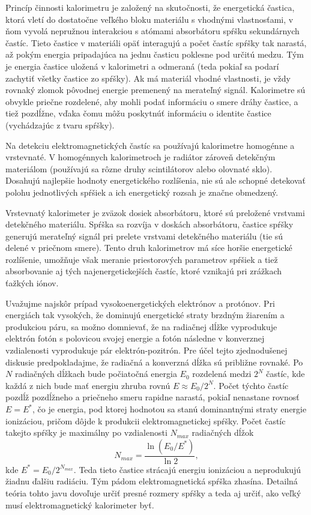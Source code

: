 \documentclass[../../main.tex]{subfiles}
\begin{document}
Princíp činnosti kalorimetru je založený na skutočnosti, že energetická častica, ktorá vletí do dostatočne veľkého bloku materiálu s vhodnými vlastnosťami, v ňom vyvolá nepružnou interakciou s atómami absorbátoru spŕšku sekundárnych častíc. Tieto častice v materiáli opäť interagujú a počet častíc spŕšky tak narastá, až pokým energia pripadajúca na jednu časticu poklesne pod určitú medzu. Tým je energia častice uložená v kalorimetri a odmeraná (teda pokiaľ sa podarí zachytiť všetky častice zo spŕšky). Ak má materiál vhodné vlastnosti, je vždy rovnaký zlomok pôvodnej energie premenený na merateľný signál. Kalorimetre sú obvykle priečne rozdelené, aby mohli podať informáciu o smere dráhy častice, a tiež pozdĺžne, vďaka čomu môžu poskytnúť informáciu o identite častice (vychádzajúc z tvaru spŕšky).

Na detekciu elektromagnetických častíc sa používajú kalorimetre homogénne a vrstevnaté. V homogénnych kalorimetroch je radiátor zároveň detekčným materiálom (používajú sa rôzne druhy scintilátorov alebo olovnaté sklo). Dosahujú najlepšie hodnoty energetického rozlíšenia, nie sú ale schopné detekovať polohu jednotlivých spŕšiek a ich energetický rozsah je značne obmedzený.

Vrstevnatý kalorimeter je zväzok dosiek absorbátoru, ktoré sú preložené vrstvami detekčného materiálu. Spŕška sa rozvíja v doskách absorbátoru, častice spŕšky generujú merateľný signál pri prelete vrstvami detekčného materiálu (tie sú delené v priečnom smere). Tento druh kalorimetrov má síce horšie energetické rozlíšenie, umožňuje však meranie priestorových parametrov spŕšiek a tiež absorbovanie aj tých najenergetickejších častíc, ktoré vznikajú pri zrážkach ťažkých iónov.

Uvažujme najskôr prípad vysokoenergetických elektrónov a protónov. Pri energiách tak vysokých, že dominujú energetické straty brzdným žiarením a produkciou páru, sa možno domnievať, že na radiačnej dĺžke vyprodukuje elektrón fotón s polovicou svojej energie a fotón následne v konverznej vzdialenosti vyprodukuje pár elektrón-pozitrón. Pre účel tejto zjednodušenej diskusie predpokladajme, že radiačná a konverzná dĺžka sú približne rovnaké. Po $N$ radiačných dĺžkach bude počiatočná energia $E_0$ rozdelená medzi $2^N$ častíc, kde každá z nich bude mať energiu zhruba rovnú $E\approx E_0/2^N$. Počet týchto častíc pozdĺž pozdĺžneho a priečneho smeru rapidne narastá, pokiaľ nenastane rovnosť $E=E^*$, čo je energia, pod ktorej hodnotou sa stanú dominantnými straty energie ionizáciou, pričom dôjde k produkcii elektromagnetickej spŕšky. Počet častíc takejto spŕšky je maximálny po vzdialenosti $N_{max}$ radiačných dĺžok
\begin{equation}
N_{max}=\dfrac{\ln (E_0/E^*)}{\ln 2},
\end{equation}
kde $E^*=E_0/2^{N_{max}}$. Teda tieto častice strácajú energiu ionizáciou a neprodukujú žiadnu ďalšiu radiáciu. Tým pádom elektromagnetická spŕška zhasína. Detailná teória tohto javu dovoľuje určiť presné rozmery spŕšky a teda aj určiť, ako veľký musí elektromagnetický kalorimeter byť.
\end{document}
